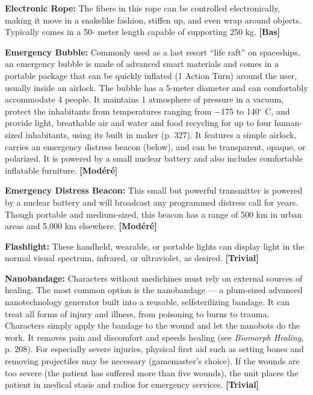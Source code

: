 {{\textbf{Electronic Rope:} The fibers in this rope can be controlled electronically, making it move in a snakelike fashion, stiffen up, and even wrap around objects. Typically comes in a 50- meter length capable of supporting 250 kg. \textbf{[Bas]} 

\textbf{Emergency Bubble:} Commonly used as a last resort ``life raft'' on spaceships, an emergency bubble is made of advanced smart materials and comes in a portable package that can be quickly inflated (1 Action Turn) around the user, usually inside an airlock. The bubble has a 5-meter diameter and can comfortably accommodate 4 people. It maintains 1 atmosphere of pressure in a vacuum, protect the inhabitants from temperatures ranging from $-$175 to 140$^{\circ}$ C, and provide light, breathable air and water and food recycling for up to four human-sized inhabitants, using its built in maker (p. 327). It features a simple airlock, carries an emergency distress beacon (below), and can be transparent, opaque, or polarized. It is powered by a small nuclear battery and also includes comfortable inflatable furniture. \textbf{[Modéré]} 

\textbf{Emergency Distress Beacon:} This small but powerful transmitter is powered by a nuclear battery and will broadcast any programmed distress call for years. Though portable and medium-sized, this beacon has a range of 500 km in urban areas and 5,000 km elsewhere. \textbf{[Modéré]} 

\textbf{Flashlight:} These handheld, wearable, or portable lights can display light in the normal visual spectrum, infrared, or ultraviolet, as desired. \textbf{[Trivial]} 

\textbf{Nanobandage:} Characters without medichines must rely on external sources of healing. The most common option is the nanobandage --- a plum-sized advanced nanotechnology generator built into a reusable, selfsterilizing bandage. It can treat all forms of injury and illness, from poisoning to burns to trauma. Characters simply apply the bandage to the wound and let the nanobots do the work. It removes pain and discomfort and speeds healing (see \emph{Biomorph Healing}, p. 208). For especially severe injuries, physical first aid such as setting bones and removing projectiles may be necessary (gamemaster’s choice). If the wounds are too severe (the patient has suffered more than five wounds), the unit places the patient in medical stasis and radios for emergency services. \textbf{[Trivial]} 

}}
